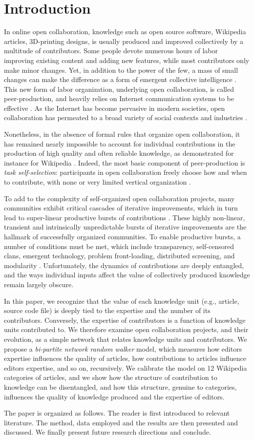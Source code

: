 \section{Introduction}
In online open collaboration, knowledge such as open source software, Wikipedia articles,  3D-printing designs, is usually produced and improved collectively by a multitude of contributors. Some people devote numerous hours of labor improving existing content and adding new features, while most contributors only make minor changes. Yet, in addition to the power of the few, a mass of small changes can make the difference as a form of emergent collective intelligence \cite{kittur2007power}.  This new form of labor organization, underlying open collaboration, is called peer-production, and heavily relies on Internet communication systems to be effective \cite{benkler2002}. As the Internet has become pervasive in modern societies, open collaboration has permeated to a broad variety of social contexts and industries \cite{benkler2011leviathan}. 

Nonetheless, in the absence of formal rules that organize open collaboration, it has remained nearly impossible to account for individual contributions in the production of high quality and often reliable knowledge, as demonstrated for instance for Wikipedia \cite{giles2005internet}. Indeed, the most basic component of peer-production is {\it task self-selection}: participants in open collaboration freely choose how and when to contribute, with none or very limited vertical organization \cite{benkler2002}.

To add to the complexity of self-organized open collaboration projects, many communities exhibit critical cascades of iterative improvements, which in turn lead to super-linear productive bursts of contributions \cite{sornette2014howmuch}. These highly non-linear, transient and intrinsically unpredictable bursts of iterative improvements are the hallmark of successfully organized communities. To enable productive bursts, a number of conditions must be met, which include transparency, self-censored clans, emergent technology, problem front-loading, distributed screening, and modularity \cite{vonkrogh2014designing}. Unfortunately, the dynamics of contributions are deeply entangled, and the ways individual inputs affect the value of collectively produced knowledge remain largely obscure. 

In this paper, we recognize that the value of each knowledge unit (e.g., article, source code file) is deeply tied to the expertise and the number of its contributors. Conversely, the expertise of contributors is a function of knowledge units contributed to. We therefore examine open collaboration projects, and their evolution, as a simple network that relates knowledge units and contributors. We propose a {\it bi-partite network random walker} model, which measures how editors expertise influences the quality of articles, how contributions to articles influence editors expertise, and so on, recursively. We calibrate the model on 12 Wikipedia categories of articles, and we show how the structure of contribution to knowledge can be disentangled, and how this structure, genuine to categories, influences the quality of knowledge produced and the expertise of editors.

The paper is organized as follows. The reader is first introduced to relevant literature. The method, data employed and the results are then presented and discussed. We finally present future research directions and conclude.
